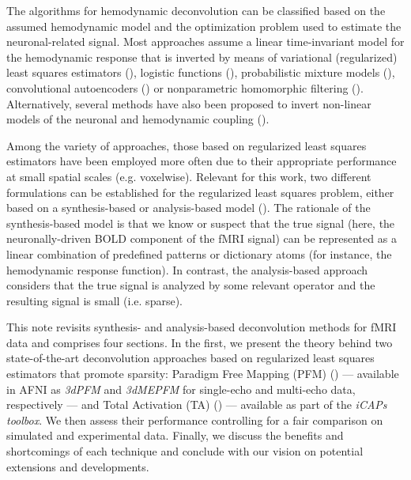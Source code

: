 The algorithms for hemodynamic deconvolution can be classified based on the assumed hemodynamic model and the optimization problem used to estimate the neuronal-related signal. Most approaches assume a linear time-invariant model for the hemodynamic response that is inverted by means of variational (regularized) least squares estimators (\citealt{Glover1999DeconvolutionImpulseResponse,Gitelman2003Modelingregionalpsychophysiologic,Gaudes2010Detectioncharacterizationsingle,Gaudes2012Structuredsparsedeconvolution,Gaudes2013Paradigmfreemapping,CaballeroGaudes2019deconvolutionalgorithmmulti,HernandezGarcia2011Neuronaleventdetection,Karahanoglu2013TotalactivationfMRI,Cherkaoui2019SparsitybasedBlind,Costantini2021ParadigmFreeRegularization,Huetel2021Hemodynamicmatrixfactorization}), logistic functions (\citealt{Bush2013Decodingneuralevents,Bush2015deconvolutionbasedapproach,Loula2018DecodingfMRIactivity}), probabilistic mixture models (\cite{Pidnebesna2019EstimatingSparseNeuronal}), convolutional autoencoders (\citealt{Huetel2018NeuralActivationEstimation}) or nonparametric homomorphic filtering (\citealt{Sreenivasan2015NonparametricHemodynamicDeconvolution}). Alternatively, several methods have also been proposed to invert non-linear models of the neuronal and hemodynamic coupling (\citealt{Riera2004statespacemodel,Friston2008DEMvariationaltreatment,Havlicek2011Dynamicmodelingneuronal,Aslan2016Jointstateparameter,Madi2017HybridCubatureKalman,ruizeuler2018nonlinear}). 

Among the variety of approaches, those based on regularized least squares estimators have been employed more often due to their appropriate performance at small spatial scales (e.g. voxelwise). Relevant for this work, two different formulations can be established for the regularized least squares problem, either based on a synthesis-based or analysis-based model (\citealt{Elad2007Analysisversussynthesis,ortelli2019synthesis}). The rationale of the synthesis-based model is that we know or suspect that the true signal (here, the neuronally-driven BOLD component of the fMRI signal) can be represented as a linear combination of predefined patterns or dictionary atoms (for instance, the hemodynamic response function). In contrast, the analysis-based approach considers that the true signal is analyzed by some relevant operator and the resulting signal is small (i.e. sparse).  

This note revisits synthesis- and analysis-based deconvolution methods for fMRI data and comprises four sections. In the first, we present the theory behind two state-of-the-art deconvolution approaches based on regularized least squares estimators that promote sparsity: Paradigm Free Mapping (PFM) (\citealt{Gaudes2013Paradigmfreemapping}) --- available in AFNI as \textit{3dPFM} and \textit{3dMEPFM} for single-echo and multi-echo data, respectively --- and Total Activation (TA) (\citealt{Karahanoglu2013TotalactivationfMRI}) --- available as part of the \textit{iCAPs toolbox}. We then assess their performance controlling for a fair comparison on simulated and experimental data. Finally, we discuss the benefits and shortcomings of each technique and conclude with our vision on potential extensions and developments.
